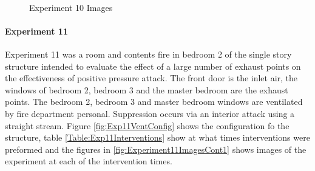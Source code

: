 \documentclass{article}
\begin{document}
\begin{figure}[H]
	\ContinuedFloat 
	\centering 
	 \ 
	 \ 
	\caption{Experiment 10 Images}
	\label{fig:Experiment10ImagesCont3} 
\end{figure}

\paragraph{Experiment 11}\mbox{}

Experiment 11 was a room and contents fire in bedroom 2 of the single story structure intended to evaluate the effect of a large number of exhaust points on the effectiveness of positive pressure attack. The front door is the inlet air, the windows of bedroom 2, bedroom 3 and the master bedroom are the exhaust points. The bedroom 2, bedroom 3 and master bedroom windows are ventilated by fire department personal. Suppression occurs via an interior attack using a straight stream. Figure \ref{fig:Exp11VentConfig} shows the configuration fo the structure, table \ref{Table:Exp11Interventions} show at what times interventions were preformed and the figures in \ref{fig:Experiment11ImagesCont1} shows images of the experiment at each of the intervention times.
\end{document}
